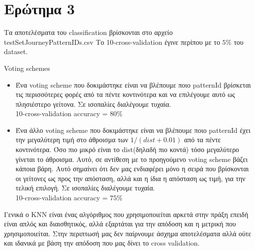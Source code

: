 \documentclass[a4paper,10pt]{article}
\begin{document}
    \section*{Ερώτημα 3}
        Τα αποτελέσματα του classification βρίσκονται στο αρχείο \\ 
        testSet\textunderscore JourneyPatternIDs.csv
        Το 10-cross-validation έγινε περίπου με το $5\%$ του dataset.
         
        Voting schemes
        \begin{itemize}
            \item Ένα voting scheme που δοκιμάστηκε είναι να βλέπουμε ποιο patternId βρίσκεται τις περισσότερες φορές από τα πέντε
            κοντινότερα και να επιλέγουμε αυτό ως πλησιέστερο γείτονα. Σε ισοπαλίες διαλέγουμε τυχαία. \\
            10-cross-validation accuracy = $80\%$
            \item Ένα άλλο voting scheme που δοκιμάστηκε είναι να βλέπουμε ποιο patternId έχει την μεγαλύτερη τιμή στο
            άθροισμα των $1 / (dist + 0.01)$ από τα πέντε κοντινότερα. Όσο πιο μικρό είναι το dist(δηλαδή πιο κοντά) τόσο μεγαλύτερο 
            γίνεται το άθροισμα. Αυτό, σε αντίθεση με το προηγούμενο voting scheme βάζει κάποια βάρη. Αυτό σημαίνει ότι δεν μας 
            ενδιαφέρει μόνο η σειρά που βρίσκονται οι γείτονες ως προς την απόσταση, αλλά και η ίδια η απόσταση ως τιμή, για την τελική 
            επιλογή. Σε ισοπαλίες διαλέγουμε τυχαία. \\
            10-cross-validation accuracy = $75\%$
        \end{itemize}
        
        Γενικά ο KNN είναι ένας αλγόριθμος που χρησιμοποιείται αρκετά στην πράξη επειδή είναι απλός και διαισθητικός, 
        αλλά εξαρτάται για την απόδοση και η μετρική που χρησιμοποιείται. Στην περιπτωσή μας δεν παίρνουμε άσχημα αποτελέσματα
        αλλά ούτε και ιδανικά με βάση την απόδοση που μας δίνει το cross validation.
\end{document}
